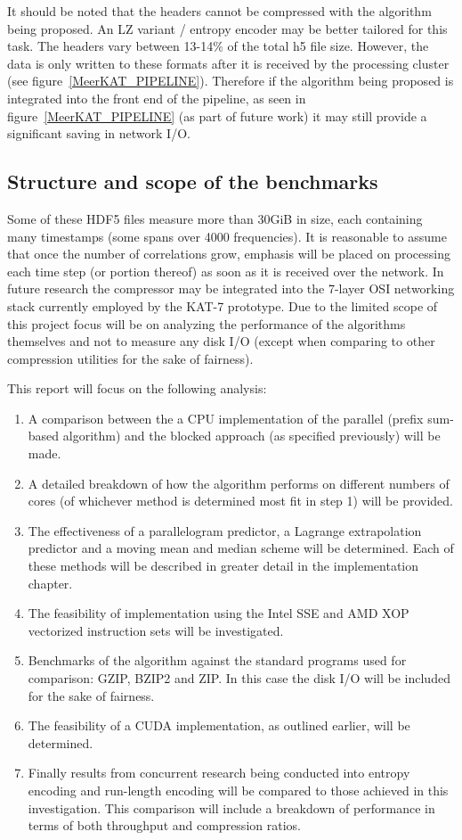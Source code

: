 It should be noted that the headers cannot be compressed with the algorithm being proposed. An LZ variant / entropy encoder may be better tailored for this task. 
The headers vary between 13-14\% of the total h5 file size. However, the data is only written to these formats after it is received by the processing cluster (see 
figure~\ref{MeerKAT_PIPELINE}). Therefore if the algorithm being proposed is integrated into the front end of the pipeline, as seen in figure~\ref{MeerKAT_PIPELINE} (as part of 
future work) it may still provide a significant saving in network I/O. 
\subsection{Structure and scope of the benchmarks}
Some of these HDF5 files measure more than 30GiB in size, each containing many timestamps (some spans over 4000 frequencies). It is reasonable to assume that once the number of correlations grow, emphasis will be placed on processing each 
time step (or portion thereof) as soon as it is received over the network. In future research the compressor may be integrated into the 7-layer OSI networking stack currently employed by the KAT-7 prototype. Due to the limited
scope of this project focus will be on analyzing the performance of the algorithms themselves and not to measure any disk I/O (except when comparing to other compression utilities for the sake of fairness).

This report will focus on the following analysis:
\begin{enumerate}
 \item A comparison between the a CPU implementation of the parallel (prefix sum-based algorithm) and the blocked approach (as specified previously) will be made.
 \item A detailed breakdown of how the algorithm performs on different numbers of cores (of whichever method is determined most fit in step 1) will be provided.
 \item The effectiveness of a parallelogram predictor, a Lagrange extrapolation predictor \cite{engelson2000lossless} and a moving mean and median scheme will be determined. 
       Each of these methods will be described in greater detail in the implementation chapter.
 \item The feasibility of implementation using the Intel SSE and AMD XOP vectorized instruction sets will be investigated.
 \item Benchmarks of the algorithm against the standard programs used for comparison: GZIP, BZIP2 and ZIP. In this case the disk I/O will be included for the sake of fairness.
 \item The feasibility of a CUDA implementation, as outlined earlier, will be determined.
 \item Finally results from concurrent research being conducted into entropy encoding and run-length encoding will be compared to those achieved in this investigation. This comparison will include a 
       breakdown of performance in terms of both throughput and compression ratios.
\end{enumerate}
